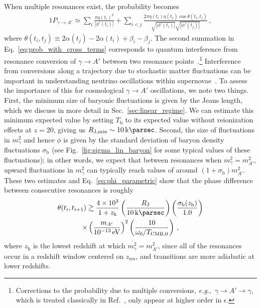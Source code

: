 \documentclass[prd,aps,10pt,nofootinbib,twocolumn,superscriptaddress,preprintnumbers,balancelastpage,longbibliography]{revtex4-1}
\begin{document}
When multiple resonances exist, the probability becomes
%
\begin{alignat}{1}
    P_{\gamma \to A'} \simeq \sum_{i} \frac{\pi \eta(t_i)^2}{|\phi'(t_i)|} + \sum_{i < j} \frac{2 \pi \eta(t_i) \eta(t_j) \cos \theta(t_i,t_j)}{\sqrt{|\phi'(t_i)|}\sqrt{|\phi'(t_j)|}} \,,
    \label{eq:prob_with_cross_terms}
\end{alignat}
%
where $\theta(t_i, t_j) \equiv2\alpha(t_j) - 2\alpha(t_i) + \beta_i - \beta_j$. 
The second summation in Eq.~\eqref{eq:prob_with_cross_terms} corresponds to quantum interference from resonance conversion of $\gamma \to A'$ between two resonance points~\cite{Dasgupta:2005wn}.\footnote{Corrections to the probability due to multiple conversions, \emph{e.g.},\ $\gamma \to A' \to \gamma$, which is treated classically in Ref.~\cite{Mirizzi:2009iz}, only appear at higher order in $\epsilon$.} 
Interference from conversions along a trajectory due to stochastic matter fluctuations can be important in understanding neutrino oscillations within supernovae~\cite{Dasgupta:2005wn,Fogli:2006xy,Friedland:2006ta}.
To assess the importance of this for cosmological $\gamma \to A'$ oscillations, we note two things. First, the minimum size of baryonic fluctuations is given by the Jeans length, which we discuss in more detail in Sec.~\ref{sec:linear_regime}. 
We can estimate this minimum expected value by setting $T_\text{b}$ to its expected value without reionization effects at $z = 20$, giving us $R_\text{J,min} \sim \SI{10}{\kilo\parsec}$. 
Second, the size of fluctuations in $m_\gamma^2$ and hence $\phi$ is given by the standard deviation of baryon density fluctuations $\sigma_\text{b}$ (see Fig.~\ref{fig:sigma_lin_baryon} for some typical values of these fluctuations); in other words, we expect that between resonances when $m_\gamma^2 = m_{A'}^2$, upward fluctuations in $m_\gamma^2$ can typically reach values of around $(1+\sigma_\text{b})m_{A'}^2$.
These two estimates and Eq.~\eqref{eq:phi_parametric} show that the phase difference between consecutive resonances is roughly
%
\begin{multline}
    \theta(t_i, t_{i+1}) \gtrsim \frac{4 \times 10^3}{1+z_\text{h}} \left(\frac{R_\text{J}}{\SI{10}{\kilo\parsec}}\right) \left(\frac{\sigma_\text{b}(z_\text{h})}{1.0}\right) \\
    \times \left(\frac{m_{A'}}{\SI{e-13}{\eV}}\right)^2 \left(\frac{10}{\omega_0/T_{\text{CMB},0}}\right) \,,
\end{multline}
%
where $z_\text{h}$ is the lowest redshift at which $\overline{m_\gamma^2} = m_{A'}^2$, since all of the resonances occur in a redshift window centered on $z_\text{res}$, and transitions are more adiabatic at lower redshifts. 
\end{document}
